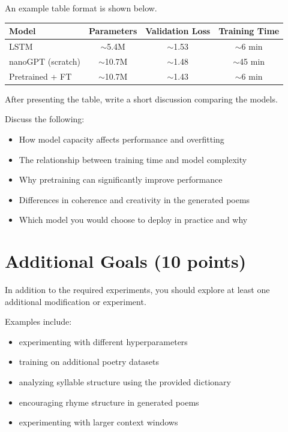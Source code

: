 An example table format is shown below.

\begin{center}
\begin{tabular}{lccc}
\hline
Model & Parameters & Validation Loss & Training Time \\
\hline
LSTM & $\sim$5.4M & $\sim$1.53 & $\sim$6 min \\
nanoGPT (scratch) & $\sim$10.7M & $\sim$1.48 & $\sim$45 min \\
Pretrained + FT & $\sim$10.7M & $\sim$1.43 & $\sim$6 min \\
\hline
\end{tabular}
\end{center}

After presenting the table, write a short discussion comparing the models.

\begin{solution}

Discuss the following:

\begin{itemize}

\item How model capacity affects performance and overfitting

\item The relationship between training time and model complexity

\item Why pretraining can significantly improve performance

\item Differences in coherence and creativity in the generated poems

\item Which model you would choose to deploy in practice and why

\end{itemize}

\end{solution}

\section{Additional Goals (10 points)}

In addition to the required experiments, you should explore at least one
additional modification or experiment.

Examples include:

\begin{itemize}

\item experimenting with different hyperparameters
\item training on additional poetry datasets
\item analyzing syllable structure using the provided dictionary
\item encouraging rhyme structure in generated poems
\item experimenting with larger context windows

\end{itemize}

